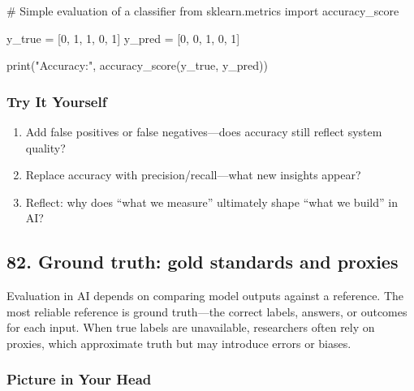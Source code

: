 \documentclass[
  letterpaper,
  DIV=11,
  numbers=noendperiod]{scrreprt}
\newenvironment{Shaded}{\begin{snugshade}}{\end{snugshade}}
\newcommand{\BuiltInTok}[1]{\textcolor[rgb]{0.00,0.23,0.31}{#1}}
\newcommand{\CommentTok}[1]{\textcolor[rgb]{0.37,0.37,0.37}{#1}}
\newcommand{\DecValTok}[1]{\textcolor[rgb]{0.68,0.00,0.00}{#1}}
\newcommand{\ImportTok}[1]{\textcolor[rgb]{0.00,0.46,0.62}{#1}}
\newcommand{\NormalTok}[1]{\textcolor[rgb]{0.00,0.23,0.31}{#1}}
\newcommand{\OperatorTok}[1]{\textcolor[rgb]{0.37,0.37,0.37}{#1}}
\newcommand{\StringTok}[1]{\textcolor[rgb]{0.13,0.47,0.30}{#1}}
\providecommand{\tightlist}{%
  \setlength{\itemsep}{0pt}\setlength{\parskip}{0pt}}
\begin{document}
\begin{Shaded}
\begin{Highlighting}[]
\CommentTok{\# Simple evaluation of a classifier}
\ImportTok{from}\NormalTok{ sklearn.metrics }\ImportTok{import}\NormalTok{ accuracy\_score}

\NormalTok{y\_true }\OperatorTok{=}\NormalTok{ [}\DecValTok{0}\NormalTok{, }\DecValTok{1}\NormalTok{, }\DecValTok{1}\NormalTok{, }\DecValTok{0}\NormalTok{, }\DecValTok{1}\NormalTok{]}
\NormalTok{y\_pred }\OperatorTok{=}\NormalTok{ [}\DecValTok{0}\NormalTok{, }\DecValTok{0}\NormalTok{, }\DecValTok{1}\NormalTok{, }\DecValTok{0}\NormalTok{, }\DecValTok{1}\NormalTok{]}

\BuiltInTok{print}\NormalTok{(}\StringTok{"Accuracy:"}\NormalTok{, accuracy\_score(y\_true, y\_pred))}
\end{Highlighting}
\end{Shaded}

\subsubsection{Try It Yourself}\label{try-it-yourself-80}

\begin{enumerate}
\def\labelenumi{\arabic{enumi}.}
\tightlist
\item
  Add false positives or false negatives---does accuracy still reflect
  system quality?
\item
  Replace accuracy with precision/recall---what new insights appear?
\item
  Reflect: why does ``what we measure'' ultimately shape ``what we
  build'' in AI?
\end{enumerate}

\subsection{82. Ground truth: gold standards and
proxies}\label{ground-truth-gold-standards-and-proxies}

Evaluation in AI depends on comparing model outputs against a reference.
The most reliable reference is ground truth---the correct labels,
answers, or outcomes for each input. When true labels are unavailable,
researchers often rely on proxies, which approximate truth but may
introduce errors or biases.

\subsubsection{Picture in Your Head}\label{picture-in-your-head-81}
\end{document}
